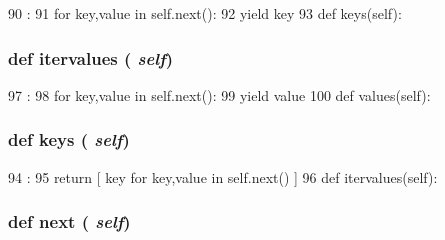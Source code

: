 \begin{DoxyCode}
90                       :
91         for key,value in self.next():
92             yield key
93 
    def keys(self):
\end{DoxyCode}
\hypertarget{classm5_1_1util_1_1multidict_1_1multidict_aeb6e8630a10560ad0d4b34377c790f19}{
\subsubsection[{itervalues}]{\setlength{\rightskip}{0pt plus 5cm}def itervalues ( {\em self})}}
\label{classm5_1_1util_1_1multidict_1_1multidict_aeb6e8630a10560ad0d4b34377c790f19}



\begin{DoxyCode}
97                         :
98         for key,value in self.next():
99             yield value
100 
    def values(self):
\end{DoxyCode}
\hypertarget{classm5_1_1util_1_1multidict_1_1multidict_aeb7ba70a3c91eced4f8d49ac5dc0c398}{
\subsubsection[{keys}]{\setlength{\rightskip}{0pt plus 5cm}def keys ( {\em self})}}
\label{classm5_1_1util_1_1multidict_1_1multidict_aeb7ba70a3c91eced4f8d49ac5dc0c398}



\begin{DoxyCode}
94                   :
95         return [ key for key,value in self.next() ]
96 
    def itervalues(self):
\end{DoxyCode}
\hypertarget{classm5_1_1util_1_1multidict_1_1multidict_a1add561a14f78ba11ea73195789b60da}{
\subsubsection[{next}]{\setlength{\rightskip}{0pt plus 5cm}def next ( {\em self})}}
\label{classm5_1_1util_1_1multidict_1_1multidict_a1add561a14f78ba11ea73195789b60da}



